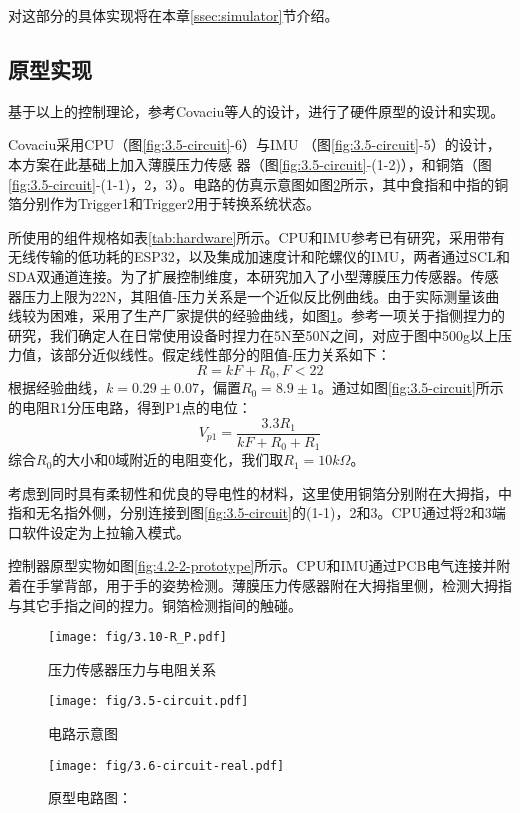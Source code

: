 对这部分的具体实现将在本章\ref{ssec:simulator}节介绍。

\subsection{原型实现}\label{ssec:num1}

基于以上的控制理论，参考Covaciu\cites{covaciu2022control}等人的设计，进行了硬件原型的设计和实现。

Covaciu\cites{covaciu2022control}采用CPU（图\ref{fig:3.5-circuit}-6）与IMU （图\ref{fig:3.5-circuit}-5）的设计，本方案在此基础上加入薄膜压力传感
器（图\ref{fig:3.5-circuit}-(1-2)），和铜箔（图\ref{fig:3.5-circuit}-(1-1)，2，3）。电路的仿真示意图如图\ref{fig:4.2-1-circuit}所示，其中食指和中指的铜箔分别作为Trigger1和Trigger2用于转换系统状态。

所使用的组件规格如表\ref{tab:hardware}所示。CPU和IMU参考已有研究\cites{covaciu2022control}，采用带有无线传输的低功耗的ESP32，以及集成加速度计和陀螺仪的IMU，两者通过SCL和SDA双通道连接。为了扩展控制维度，本研究加入了小型薄膜压力传感器。传感器压力上限为22N，其阻值-压力关系是一个近似反比例曲线。由于实际测量该曲线较为困难，采用了生产厂家提供的经验曲线，如图\ref{fig:3.10-R_P}。参考一项关于指侧捏力的研究\cites{呼慧敏2022中国成年人指侧捏力测量研究}，我们确定人在日常使用设备时捏力在5N至50N之间，对应于图中500g以上压力值，该部分近似线性。假定线性部分的阻值-压力关系如下：
$$
R = kF+R_0, F<22
$$
根据经验曲线，$k=0.29\pm 0.07$，偏置$R_0=8.9\pm1$。通过如图\ref{fig:3.5-circuit}所示的电阻R1分压电路，得到P1点的电位：
$$
V_{p1} = \frac{3.3R_1}{kF+R_0+R_1}
$$
综合$R_0$的大小和0域附近的电阻变化，我们取$R_1=10k\Omega$。

考虑到同时具有柔韧性和优良的导电性的材料，这里使用铜箔分别附在大拇指，中指和无名指外侧，分别连接到图\ref{fig:3.5-circuit}的(1-1)，2和3。CPU通过将2和3端口软件设定为上拉输入模式。

控制器原型实物如图\ref{fig:4.2-2-prototype}所示。CPU和IMU通过PCB电气连接并附着在手掌背部，用于手的姿势检测。薄膜压力传感器附在大拇指里侧，检测大拇指与其它手指之间的捏力。铜箔检测指间的触碰。

\begin{figure}[htbp]
    \centering
    \texttt{[image: fig/3.10-R\_P.pdf]}
    \caption{压力传感器压力与电阻关系}
    \label{fig:3.10-R_P}
\end{figure}

\begin{figure}[htbp]
    \centering
    \texttt{[image: fig/3.5-circuit.pdf]}
    \caption{电路示意图}
    \label{fig:3.5-circuit}

    \vspace{-10pt}
    \texttt{[image:  fig/3.6-circuit-real.pdf]}
    \caption{原型电路图：}
    \label{fig:4.2-1-circuit}
    \vspace{-20pt}
\end{figure}

